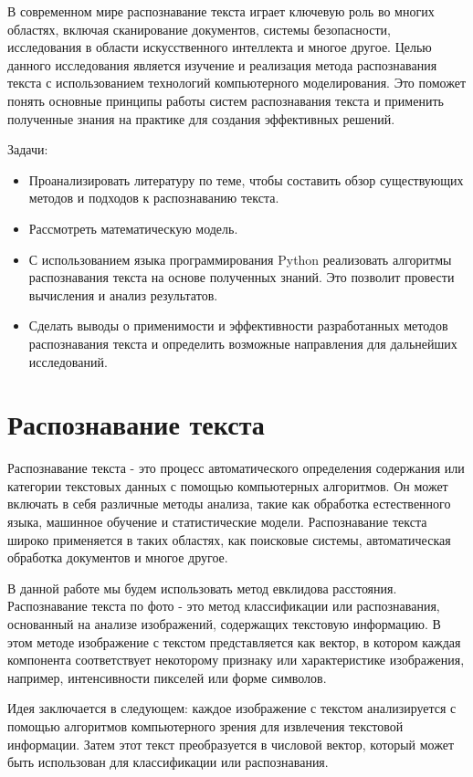 \documentclass[14pt]{extreport}
\begin{document}
В современном мире распознавание текста играет ключевую роль во многих областях, включая сканирование документов, системы безопасности, исследования в области искусственного интеллекта и многое другое. Целью данного исследования является изучение и реализация метода распознавания текста с использованием технологий компьютерного моделирования. Это поможет понять основные принципы работы систем распознавания текста и применить полученные знания на практике для создания эффективных решений.

Задачи:
\begin{itemize}
    \item Проанализировать литературу по теме, чтобы составить обзор существующих методов и подходов к распознаванию текста.
    \item Рассмотреть математическую модель.
    \item С использованием языка программирования Python реализовать алгоритмы распознавания текста на основе полученных знаний. Это позволит провести вычисления и анализ результатов.
    \item Сделать выводы о применимости и эффективности разработанных методов распознавания текста и определить возможные направления для дальнейших исследований.
\end{itemize}

\chapter{Распознавание текста}
Распознавание текста - это процесс автоматического определения содержания или категории текстовых данных с помощью компьютерных алгоритмов. Он может включать в себя различные методы анализа, такие как обработка естественного языка, машинное обучение и статистические модели. Распознавание текста широко применяется в таких областях, как поисковые системы, автоматическая обработка документов и многое другое. 

В данной работе мы будем использовать метод евклидова расстояния. Распознавание текста по фото - это метод классификации или распознавания, основанный на анализе изображений, содержащих текстовую информацию. В этом методе изображение с текстом представляется как вектор, в котором каждая компонента соответствует некоторому признаку или характеристике изображения, например, интенсивности пикселей или форме символов.

Идея заключается в следующем: каждое изображение с текстом анализируется с помощью алгоритмов компьютерного зрения для извлечения текстовой информации. Затем этот текст преобразуется в числовой вектор, который может быть использован для классификации или распознавания.
\end{document}
